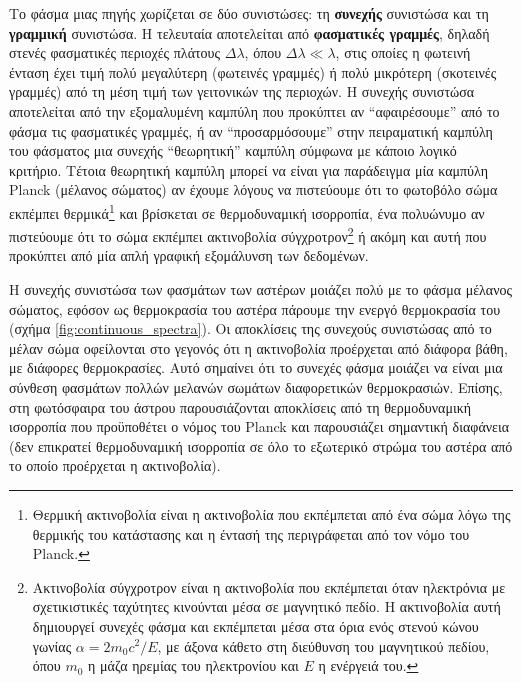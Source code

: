Το φάσμα μιας πηγής χωρίζεται σε δύο συνιστώσες: τη \textbf{συνεχής} συνιστώσα και τη \textbf{γραμμική} συνιστώσα. Η τελευταία αποτελείται από \textbf{φασματικές γραμμές}, δηλαδή στενές φασματικές περιοχές πλάτους $\Delta \lambda$, όπου $\Delta \lambda \ll \lambda$, στις οποίες η φωτεινή ένταση έχει τιμή πολύ μεγαλύτερη (φωτεινές γραμμές) ή πολύ μικρότερη (σκοτεινές γραμμές) από τη μέση τιμή των γειτονικών της περιοχών.
Η συνεχής συνιστώσα αποτελείται από την εξομαλυμένη καμπύλη που προκύπτει αν ``αφαιρέσουμε'' από το φάσμα τις φασματικές γραμμές, ή αν ``προσαρμόσουμε'' στην πειραματική καμπύλη του φάσματος μια συνεχής ``θεωρητική'' καμπύλη σύμφωνα με κάποιο λογικό κριτήριο. Τέτοια θεωρητική καμπύλη μπορεί να είναι για παράδειγμα μία καμπύλη Planck (μέλανος σώματος) αν έχουμε λόγους να πιστεύουμε ότι το φωτοβόλο σώμα εκπέμπει θερμικά\footnote{Θερμική ακτινοβολία είναι η ακτινοβολία που εκπέμπεται από ένα σώμα λόγω της θερμικής του κατάστασης και η έντασή της περιγράφεται από τον νόμο του Planck.} και βρίσκεται σε θερμοδυναμική ισορροπία, ένα πολυώνυμο αν πιστεύουμε ότι το σώμα εκπέμπει ακτινοβολία σύγχροτρον\footnote{Ακτινοβολία σύγχροτρον είναι η ακτινοβολία που εκπέμπεται όταν ηλεκτρόνια με σχετικιστικές ταχύτητες κινούνται μέσα σε μαγνητικό πεδίο. Η ακτινοβολία αυτή δημιουργεί συνεχές φάσμα και εκπέμπεται μέσα στα όρια ενός στενού κώνου γωνίας $\alpha = 2m_0 c^2/E$, με άξονα κάθετο στη διεύθυνση του μαγνητικού πεδίου, όπου $m_0$ η μάζα ηρεμίας του ηλεκτρονίου και $E$ η ενέργειά του.} ή ακόμη και αυτή που προκύπτει από μία απλή γραφική εξομάλυνση των δεδομένων.

Η συνεχής συνιστώσα των φασμάτων των αστέρων μοιάζει πολύ με το φάσμα μέλανος σώματος, εφόσον ως θερμοκρασία του αστέρα πάρουμε την ενεργό θερμοκρασία του (σχήμα \ref{fig:continuous_spectra}). Οι αποκλίσεις της συνεχούς συνιστώσας από το μέλαν σώμα οφείλονται στο γεγονός ότι η ακτινοβολία προέρχεται από διάφορα βάθη, με διάφορες θερμοκρασίες. Αυτό σημαίνει ότι το συνεχές φάσμα μοιάζει να είναι μια σύνθεση φασμάτων πολλών μελανών σωμάτων διαφορετικών θερμοκρασιών. Επίσης, στη φωτόσφαιρα του άστρου παρουσιάζονται αποκλίσεις από τη θερμοδυναμική ισορροπία που προϋποθέτει ο νόμος του Planck και παρουσιάζει σημαντική διαφάνεια (δεν επικρατεί θερμοδυναμική ισορροπία σε όλο το εξωτερικό στρώμα του αστέρα από το οποίο προέρχεται η ακτινοβολία).


